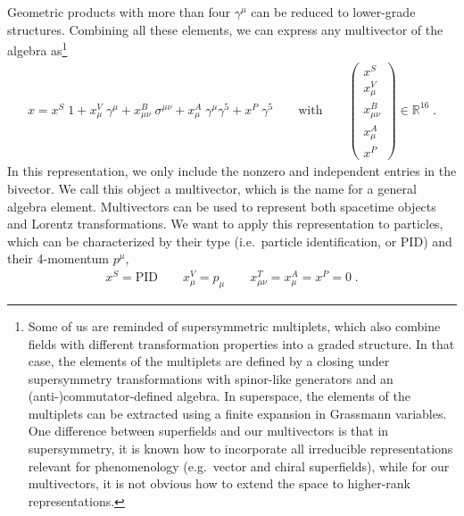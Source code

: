 \documentclass[submission, Phys]{SciPost}
\begin{document}
Geometric products with more than four $\gamma^\mu$ can be reduced to lower-grade structures. Combining all these elements, we can express any multivector of the algebra as\footnote{Some of us are reminded of supersymmetric multiplets, which also combine fields with different transformation properties into a graded structure. In that case, the elements of the multiplets are defined by a closing under supersymmetry transformations with spinor-like generators and an (anti-)commutator-defined algebra. In superspace, the elements of the multiplets can be extracted using a finite expansion in Grassmann variables. One difference between superfields and our multivectors is that in supersymmetry, it is known how to incorporate all irreducible representations relevant for phenomenology (e.g.\ vector and chiral superfields), while for our multivectors, it is not obvious how to extend the space to higher-rank representations.}
%
\begin{align}
    x= x^S \; 1 
    + x^V_\mu  \; \gamma^\mu 
    + x^B_{\mu\nu} \; \sigma^{\mu\nu} 
    + x^A_\mu \; \gamma^\mu \gamma^5 
    + x^P \; \gamma^5 
    \qquad \text{with} \qquad 
    \begin{pmatrix}
    x^S \\ x^V_\mu \\ x^B_{\mu\nu} \\ x^A_\mu \\ x^P 
    \end{pmatrix} 
    \in\mathbb{R}^{16} \; .
\label{eq:multivector}
\end{align}
%
In this representation, we only include the nonzero and independent entries in the bivector. We call this object a multivector, which is the name for a general algebra element. Multivectors can be used to represent both spacetime objects and Lorentz transformations. We want to apply this representation to particles, which can be characterized by their type (i.e.~particle identification, or $\text{PID}$) and their 4-momentum $p^\mu$,
%
\begin{align}
    x^S = \text{PID} 
    \qquad x^V_{\mu} = p_{\mu}
    \qquad x^T_{\mu\nu}=x^A_\mu=x^P=0 \; . 
    \label{eq:embedding}
\end{align}
%
\end{document}
